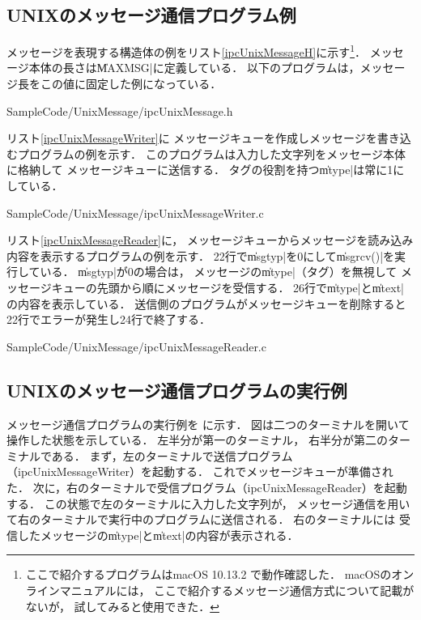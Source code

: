 \subsection{UNIXのメッセージ通信プログラム例}
メッセージを表現する構造体の例をリスト\ref{ipcUnixMessageH}に示す\footnote{
  ここで紹介するプログラムはmacOS 10.13.2 で動作確認した．
  macOSのオンラインマニュアルには，
  ここで紹介するメッセージ通信方式について記載がないが，
  試してみると使用できた．}．
メッセージ本体の長さは\|MAXMSG|に定義している．
以下のプログラムは，メッセージ長をこの値に固定した例になっている．


  {SampleCode/UnixMessage/ipcUnixMessage.h}

リスト\ref{ipcUnixMessageWriter}に
メッセージキューを作成しメッセージを書き込むプログラムの例を示す．
このプログラムは入力した文字列をメッセージ本体に格納して
メッセージキューに送信する．
タグの役割を持つ\|mtype|は常に1にしている．


  {SampleCode/UnixMessage/ipcUnixMessageWriter.c}

リスト\ref{ipcUnixMessageReader}に，
メッセージキューからメッセージを読み込み内容を表示するプログラムの例を示す．
22行で\|msgtyp|を0にして\|msgrcv()|を実行している．
\|msgtyp|が0の場合は，
メッセージの\|mtype|（タグ）を無視して
メッセージキューの先頭から順にメッセージを受信する．
26行で\|mtype|と\|mtext|の内容を表示している．
送信側のプログラムがメッセージキューを削除すると
22行でエラーが発生し24行で終了する．


  {SampleCode/UnixMessage/ipcUnixMessageReader.c}

\subsection{UNIXのメッセージ通信プログラムの実行例}
メッセージ通信プログラムの実行例を
に示す．
図は二つのターミナルを開いて操作した状態を示している．
左半分が第一のターミナル，
右半分が第二のターミナルである．
まず，左のターミナルで送信プログラム（ipcUnixMessageWriter）を起動する．
これでメッセージキューが準備された．
次に，右のターミナルで受信プログラム（ipcUnixMessageReader）を起動する．
この状態で左のターミナルに入力した文字列が，
メッセージ通信を用いて右のターミナルで実行中のプログラムに送信される．
右のターミナルには
受信したメッセージの\|mtype|と\|mtext|の内容が表示される．

